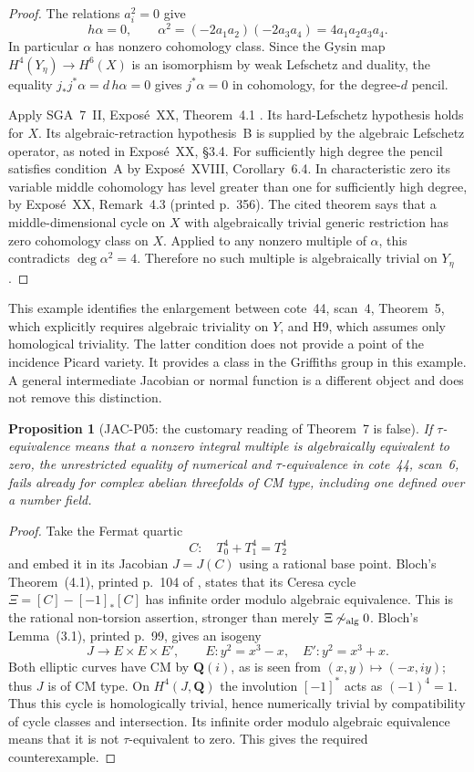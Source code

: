 \documentclass[11pt,a4paper]{article}
\newtheorem{proposition}[theorem]{Proposition}
\begin{document}
\begin{proof}
The relations $a_i^2=0$ give
\[
 h\alpha=0,
 \qquad
 \alpha^2=(-2a_1a_2)(-2a_3a_4)=4a_1a_2a_3a_4.
\]
In particular $\alpha$ has nonzero cohomology class.  Since the Gysin
map $H^4(Y_\eta)\to H^6(X)$ is an isomorphism by weak Lefschetz
and duality, the equality $j_*j^*\alpha=d\,h\alpha=0$ gives
$j^*\alpha=0$ in cohomology, for the degree-$d$ pencil.

Apply SGA~7~II, Expos\'e~XX, Theorem~4.1
\cite[printed p.~355]{SGA7II}.  Its hard-Lefschetz hypothesis holds
for $X$.  Its algebraic-retraction hypothesis~B is supplied by the
algebraic Lefschetz operator, as noted in Expos\'e~XX, \S3.4.
For sufficiently high degree the pencil satisfies condition~A by
Expos\'e~XVIII, Corollary~6.4.  In characteristic zero its variable
middle cohomology has level greater than one for sufficiently high
degree, by Expos\'e~XX, Remark~4.3 (printed p.~356).
The cited theorem says that a middle-dimensional cycle on $X$ with
algebraically trivial generic restriction has zero cohomology class
on $X$.  Applied to any nonzero multiple of $\alpha$, this contradicts
$\deg\alpha^2=4$.  Therefore no such multiple is algebraically
trivial on $Y_\eta$.
\end{proof}

This example identifies the enlargement between cote~44, scan~4,
Theorem~5, which explicitly requires algebraic triviality on $Y$,
and H9, which assumes only homological triviality.  The latter condition
does not provide a point of the incidence Picard variety.  It provides
a class in the Griffiths group in this example.  A general intermediate
Jacobian or normal function is a different object and does not remove
this distinction.

\begin{proposition}[JAC-P05: the customary reading of Theorem~7 is false]
\label{jac:P05}
If $\tau$-equivalence means that a nonzero integral multiple is
algebraically equivalent to zero, the unrestricted equality of numerical
and $\tau$-equivalence in cote~44, scan~6, fails already for complex
abelian threefolds of CM type, including one defined over a number field.
\end{proposition}

\begin{proof}
Take the Fermat quartic
\[
 C:\quad T_0^4+T_1^4=T_2^4
\]
and embed it in its Jacobian $J=J(C)$ using a rational base point.
Bloch's Theorem~(4.1), printed p.~104 of \cite{Bloch1984L}, states
that its Ceresa cycle $\Xi=[C]-[-1]_*[C]$ has infinite order modulo
algebraic equivalence.  This is the rational non-torsion assertion,
stronger than merely $\Xi\not\sim_{\rm alg}0$.
Bloch's Lemma~(3.1), printed p.~99, gives an isogeny
\[
 J\longrightarrow E\times E\times E',\qquad
 E:y^2=x^3-x,\quad E':y^2=x^3+x.
\]
Both elliptic curves have CM by $\mathbf Q(i)$, as is seen from
$(x,y)\mapsto(-x,iy)$; thus $J$ is of CM type.
On $H^4(J,\mathbf Q)$ the involution $[-1]^*$
acts as $(-1)^4=1$.  Thus this cycle is homologically trivial, hence
numerically trivial by compatibility of cycle classes and intersection.
Its infinite order modulo algebraic equivalence means that it is not
$\tau$-equivalent to zero.  This gives the required counterexample.
\end{proof}
\end{document}

